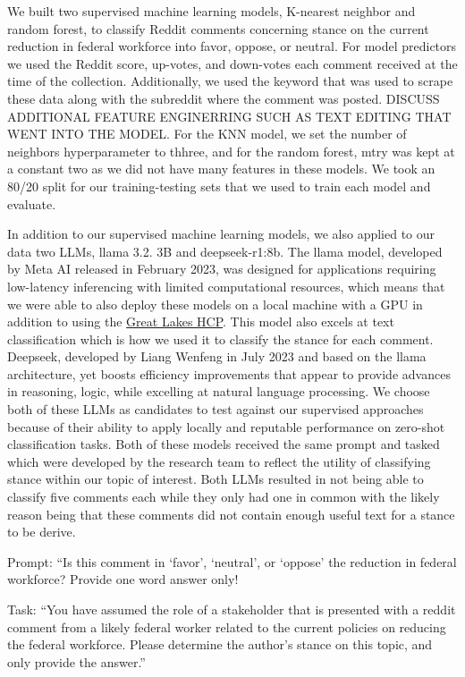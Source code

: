 \documentclass[
  12pt]{article}
\begin{document}
We built two supervised machine learning models, K-nearest neighbor and
random forest, to classify Reddit comments concerning stance on the
current reduction in federal workforce into favor, oppose, or neutral.
For model predictors we used the Reddit score, up-votes, and down-votes
each comment received at the time of the collection. Additionally, we
used the keyword that was used to scrape these data along with the
subreddit where the comment was posted. DISCUSS ADDITIONAL FEATURE
ENGINERRING SUCH AS TEXT EDITING THAT WENT INTO THE MODEL. For the KNN
model, we set the number of neighbors hyperparameter to thhree, and for
the random forest, mtry was kept at a constant two as we did not have
many features in these models. We took an 80/20 split for our
training-testing sets that we used to train each model and evaluate.

In addition to our supervised machine learning models, we also applied
to our data two LLMs, llama 3.2. 3B and deepseek-r1:8b. The llama model,
developed by Meta AI released in February 2023, was designed for
applications requiring low-latency inferencing with limited
computational resources, which means that we were able to also deploy
these models on a local machine with a GPU in addition to using the
\href{https://its.umich.edu/advanced-research-computing/}{Great Lakes
HCP}. This model also excels at text classification which is how we used
it to classify the stance for each comment. Deepseek, developed by Liang
Wenfeng in July 2023 and based on the llama architecture, yet boosts
efficiency improvements that appear to provide advances in reasoning,
logic, while excelling at natural language processing. We choose both of
these LLMs as candidates to test against our supervised approaches
because of their ability to apply locally and reputable performance on
zero-shot classification tasks. Both of these models received the same
prompt and tasked which were developed by the research team to reflect
the utility of classifying stance within our topic of interest. Both
LLMs resulted in not being able to classify five comments each while
they only had one in common with the likely reason being that these
comments did not contain enough useful text for a stance to be derive.

Prompt: ``Is this comment in `favor', `neutral', or `oppose' the
reduction in federal workforce? Provide one word answer only!

Task: ``You have assumed the role of a stakeholder that is presented
with a reddit comment from a likely federal worker related to the
current policies on reducing the federal workforce. Please determine the
author's stance on this topic, and only provide the answer.''
\end{document}
